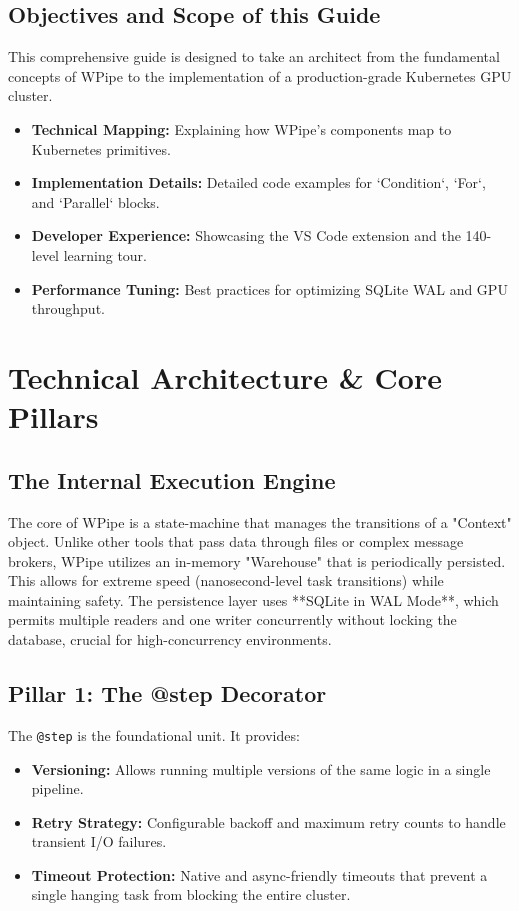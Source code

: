 \documentclass[12pt,a4paper]{report}
\begin{document}
\section{Objectives and Scope of this Guide}
This comprehensive guide is designed to take an architect from the fundamental concepts of WPipe to the implementation of a production-grade Kubernetes GPU cluster.
\begin{itemize}
    \item \textbf{Technical Mapping:} Explaining how WPipe's components map to Kubernetes primitives.
    \item \textbf{Implementation Details:} Detailed code examples for `Condition`, `For`, and `Parallel` blocks.
    \item \textbf{Developer Experience:} Showcasing the VS Code extension and the 140-level learning tour.
    \item \textbf{Performance Tuning:} Best practices for optimizing SQLite WAL and GPU throughput.
\end{itemize}

\chapter{Technical Architecture & Core Pillars}
\cleardoublepage

\section{The Internal Execution Engine}
The core of WPipe is a state-machine that manages the transitions of a "Context" object. Unlike other tools that pass data through files or complex message brokers, WPipe utilizes an in-memory "Warehouse" that is periodically persisted. This allows for extreme speed (nanosecond-level task transitions) while maintaining safety. The persistence layer uses **SQLite in WAL Mode**, which permits multiple readers and one writer concurrently without locking the database, crucial for high-concurrency environments.

\section{Pillar 1: The @step Decorator}
The \texttt{@step} is the foundational unit. It provides:
\begin{itemize}
    \item \textbf{Versioning:} Allows running multiple versions of the same logic in a single pipeline.
    \item \textbf{Retry Strategy:} Configurable backoff and maximum retry counts to handle transient I/O failures.
    \item \textbf{Timeout Protection:} Native and async-friendly timeouts that prevent a single hanging task from blocking the entire cluster.
\end{itemize}
\end{document}
